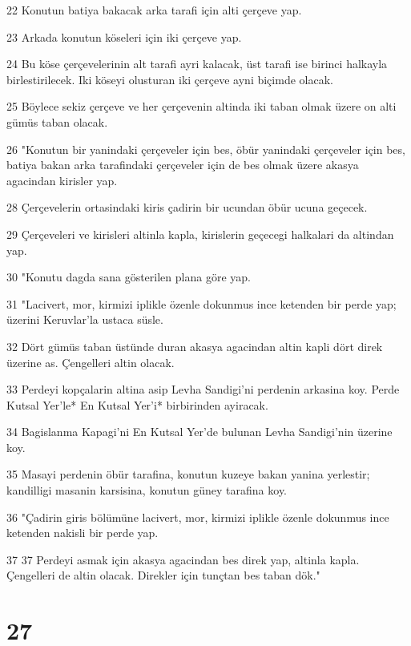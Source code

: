 \par 22 Konutun batiya bakacak arka tarafi için alti çerçeve yap.
\par 23 Arkada konutun köseleri için iki çerçeve yap.
\par 24 Bu köse çerçevelerinin alt tarafi ayri kalacak, üst tarafi ise birinci halkayla birlestirilecek. Iki köseyi olusturan iki çerçeve ayni biçimde olacak.
\par 25 Böylece sekiz çerçeve ve her çerçevenin altinda iki taban olmak üzere on alti gümüs taban olacak.
\par 26 "Konutun bir yanindaki çerçeveler için bes, öbür yanindaki çerçeveler için bes, batiya bakan arka tarafindaki çerçeveler için de bes olmak üzere akasya agacindan kirisler yap.
\par 28 Çerçevelerin ortasindaki kiris çadirin bir ucundan öbür ucuna geçecek.
\par 29 Çerçeveleri ve kirisleri altinla kapla, kirislerin geçecegi halkalari da altindan yap.
\par 30 "Konutu dagda sana gösterilen plana göre yap.
\par 31 "Lacivert, mor, kirmizi iplikle özenle dokunmus ince ketenden bir perde yap; üzerini Keruvlar'la ustaca süsle.
\par 32 Dört gümüs taban üstünde duran akasya agacindan altin kapli dört direk üzerine as. Çengelleri altin olacak.
\par 33 Perdeyi kopçalarin altina asip Levha Sandigi'ni perdenin arkasina koy. Perde Kutsal Yer'le* En Kutsal Yer'i* birbirinden ayiracak.
\par 34 Bagislanma Kapagi'ni En Kutsal Yer'de bulunan Levha Sandigi'nin üzerine koy.
\par 35 Masayi perdenin öbür tarafina, konutun kuzeye bakan yanina yerlestir; kandilligi masanin karsisina, konutun güney tarafina koy.
\par 36 "Çadirin giris bölümüne lacivert, mor, kirmizi iplikle özenle dokunmus ince ketenden nakisli bir perde yap.
\par 37 37 Perdeyi asmak için akasya agacindan bes direk yap, altinla kapla. Çengelleri de altin olacak. Direkler için tunçtan bes taban dök."

\chapter{27}


